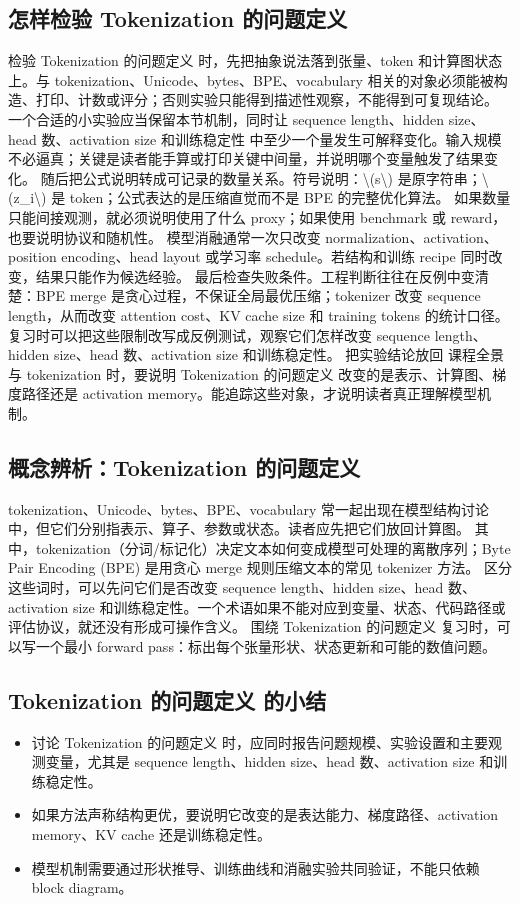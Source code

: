 \documentclass[a4paper]{article}
\begin{document}
\subsection{怎样检验 Tokenization 的问题定义}
检验 Tokenization 的问题定义 时，先把抽象说法落到张量、token 和计算图状态上。与 tokenization、Unicode、bytes、BPE、vocabulary 相关的对象必须能被构造、打印、计数或评分；否则实验只能得到描述性观察，不能得到可复现结论。
一个合适的小实验应当保留本节机制，同时让 sequence length、hidden size、head 数、activation size 和训练稳定性 中至少一个量发生可解释变化。输入规模不必逼真；关键是读者能手算或打印关键中间量，并说明哪个变量触发了结果变化。
随后把公式说明转成可记录的数量关系。符号说明：\textbackslash{}(s\textbackslash{}) 是原字符串；\textbackslash{}(z\_i\textbackslash{}) 是 token；公式表达的是压缩直觉而不是 BPE 的完整优化算法。 如果数量只能间接观测，就必须说明使用了什么 proxy；如果使用 benchmark 或 reward，也要说明协议和随机性。
模型消融通常一次只改变 normalization、activation、position encoding、head layout 或学习率 schedule。若结构和训练 recipe 同时改变，结果只能作为候选经验。
最后检查失败条件。工程判断往往在反例中变清楚：BPE merge 是贪心过程，不保证全局最优压缩；tokenizer 改变 sequence length，从而改变 attention cost、KV cache size 和 training tokens 的统计口径。复习时可以把这些限制改写成反例测试，观察它们怎样改变 sequence length、hidden size、head 数、activation size 和训练稳定性。
把实验结论放回 课程全景与 tokenization 时，要说明 Tokenization 的问题定义 改变的是表示、计算图、梯度路径还是 activation memory。能追踪这些对象，才说明读者真正理解模型机制。
\subsection{概念辨析：Tokenization 的问题定义}
tokenization、Unicode、bytes、BPE、vocabulary 常一起出现在模型结构讨论中，但它们分别指表示、算子、参数或状态。读者应先把它们放回计算图。
其中，tokenization（分词/标记化）决定文本如何变成模型可处理的离散序列；Byte Pair Encoding (BPE) 是用贪心 merge 规则压缩文本的常见 tokenizer 方法。
区分这些词时，可以先问它们是否改变 sequence length、hidden size、head 数、activation size 和训练稳定性。一个术语如果不能对应到变量、状态、代码路径或评估协议，就还没有形成可操作含义。
围绕 Tokenization 的问题定义 复习时，可以写一个最小 forward pass：标出每个张量形状、状态更新和可能的数值问题。
\subsection{Tokenization 的问题定义 的小结}
\begin{itemize}
\item 讨论 Tokenization 的问题定义 时，应同时报告问题规模、实验设置和主要观测变量，尤其是 sequence length、hidden size、head 数、activation size 和训练稳定性。
\item 如果方法声称结构更优，要说明它改变的是表达能力、梯度路径、activation memory、KV cache 还是训练稳定性。
\item 模型机制需要通过形状推导、训练曲线和消融实验共同验证，不能只依赖 block diagram。
\end{itemize}
\end{document}
